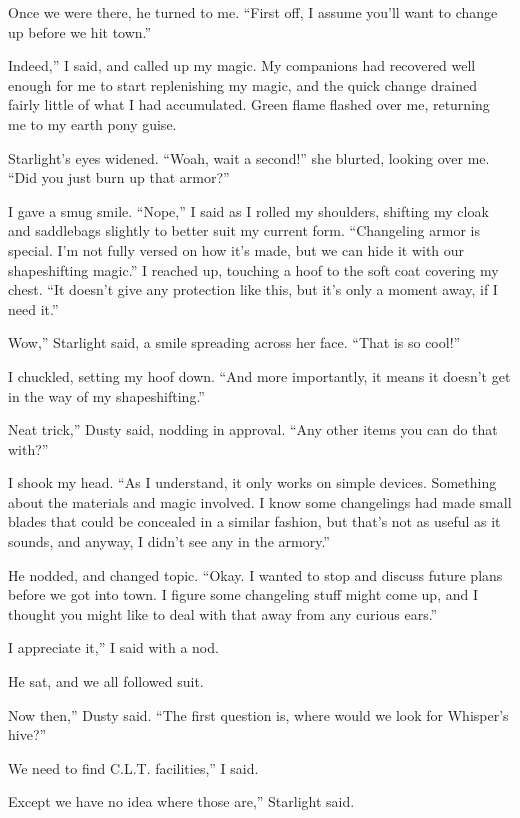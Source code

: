 Once we were there, he turned to me. “First off, I assume you’ll want to change up before we hit town.”

\leavevmode{}Indeed,” I said, and called up my magic. My companions had recovered well enough for me to start replenishing my magic, and the quick change drained fairly little of what I had accumulated. Green flame flashed over me, returning me to my earth pony guise.

Starlight’s eyes widened. “Woah, wait a second!” she blurted, looking over me. “Did you just burn up that armor?”

I gave a smug smile. “Nope,” I said as I rolled my shoulders, shifting my cloak and saddlebags slightly to better suit my current form. “Changeling armor is special. I’m not fully versed on how it’s made, but we can hide it with our shapeshifting magic.” I reached up, touching a hoof to the soft coat covering my chest. “It doesn’t give any protection like this, but it’s only a moment away, if I need it.”

\leavevmode{}Wow,” Starlight said, a smile spreading across her face. “That is so cool!”

I chuckled, setting my hoof down. “And more importantly, it means it doesn’t get in the way of my shapeshifting.”

\leavevmode{}Neat trick,” Dusty said, nodding in approval. “Any other items you can do that with?”

I shook my head. “As I understand, it only works on simple devices. Something about the materials and magic involved. I know some changelings had made small blades that could be concealed in a similar fashion, but that’s not as useful as it sounds, and anyway, I didn’t see any in the armory.”

He nodded, and changed topic. “Okay. I wanted to stop and discuss future plans before we got into town. I figure some changeling stuff might come up, and I thought you might like to deal with that away from any curious ears.”

\leavevmode{}I appreciate it,” I said with a nod.

He sat, and we all followed suit.

\leavevmode{}Now then,” Dusty said. “The first question is, where would we look for Whisper’s hive?”

\leavevmode{}We need to find C.L.T. facilities,” I said.

\leavevmode{}Except we have no idea where those are,” Starlight said.

